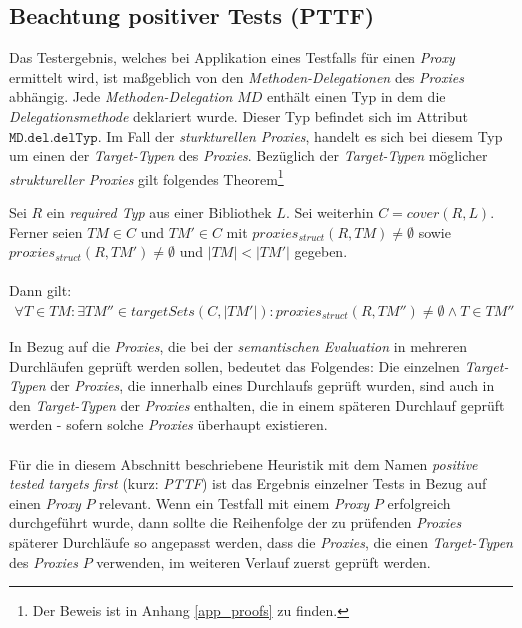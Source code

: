 \subsection{Beachtung positiver Tests (PTTF)}\label{sec_pttf}
Das Testergebnis, welches bei Applikation eines Testfalls für einen \emph{Proxy} ermittelt wird, ist maßgeblich von den \emph{Methoden-Delegationen} des \emph{Proxies} abhängig. Jede \emph{Methoden-Delegation} $\mathit{MD}$ enthält einen Typ in dem die \emph{Delegationsmethode} deklariert wurde. Dieser Typ befindet sich im Attribut $\texttt{MD.del.delTyp}$. Im Fall der \emph{sturkturellen Proxies}, handelt es sich bei diesem Typ um einen der \emph{Target-Typen} des \emph{Proxies}. Bezüglich der \emph{Target-Typen} möglicher \emph{struktureller Proxies} gilt folgendes Theorem\footnote{Der Beweis ist in Anhang \ref{app_proofs} zu finden.}
\begin{theorem}\label{lemma_wiederholteTargets}
Sei $R$ ein \emph{required Typ} aus einer Bibliothek $L$. Sei weiterhin $\mathit{C} = \mathit{cover(R,L)}$. Ferner seien $\mathit{TM} \in \mathit{C}$ und $\mathit{TM'} \in \mathit{C}$ mit $\mathit{proxies_{struct}(R,TM)} \neq \emptyset$ sowie $\mathit{proxies_{struct}(R,TM')} \neq \emptyset$ und $|\mathit{TM}| < |\mathit{TM'}|$ gegeben.
\\\\
Dann gilt:
\begin{gather*}
\forall \mathit{T} \in \mathit{TM}: \exists \mathit{TM''} \in \mathit{targetSets(C,|\mathit{TM'}|)}: \mathit{proxies_{struct}(R,TM'')} \neq \emptyset \wedge \mathit{T} \in \mathit{TM''} 
\end{gather*}
\end{theorem}
\noindent
In Bezug auf die \emph{Proxies}, die bei der \emph{semantischen Evaluation} in mehreren Durchläufen geprüft werden sollen, bedeutet das Folgendes: Die einzelnen \emph{Target-Typen} der \emph{Proxies}, die innerhalb eines Durchlaufs geprüft wurden, sind auch in den \emph{Target-Typen} der \emph{Proxies} enthalten, die in einem späteren Durchlauf geprüft werden - sofern solche \emph{Proxies} überhaupt existieren.
\\\\
Für die in diesem Abschnitt beschriebene \Gls{Heuristik} mit dem Namen \emph{positive tested targets first} (kurz: \emph{PTTF}) ist das Ergebnis einzelner Tests in Bezug auf einen \emph{Proxy} $P$ relevant. Wenn ein Testfall mit einem \emph{Proxy} $P$ erfolgreich durchgeführt wurde, dann sollte die Reihenfolge der zu prüfenden \emph{Proxies} späterer Durchläufe so angepasst werden, dass die \emph{Proxies}, die einen \emph{Target-Typen} des \emph{Proxies} $P$ verwenden, im weiteren Verlauf zuerst geprüft werden.

